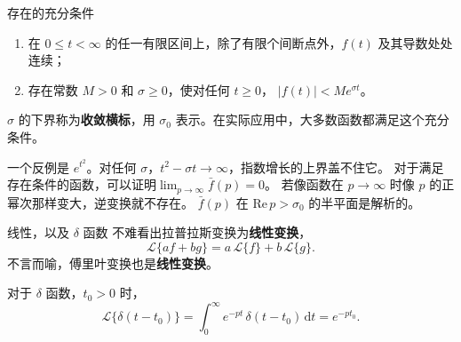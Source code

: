 \documentclass[fontset=windows, chinese, 10pt, xcolor=dvipsnames]{beamer}
\begin{document}
\begin{frame}{存在的充分条件}
  \begin{enumerate}
    \item 在 $0\leq t<\infty$ 的任一有限区间上，除了有限个间断点外，$f(t)$ 及其导数处处连续；
    \item 存在常数 $M>0$ 和 $\sigma\geq 0$，使对任何 $t\geq 0$，
      $|f(t)|<M e^{\sigma t}$。
  \end{enumerate}
  $\sigma$ 的下界称为\textbf{收敛横标}，用 $\sigma_0$ 表示。在实际应用中，大多数函数都满足这个充分条件。
  \vspace{0.3em}

  一个反例是 $e^{t^2}$。对任何 $\sigma$，$t^2-\sigma t\to\infty$，指数增长的上界盖不住它。
  对于满足存在条件的函数，可以证明$\lim_{p\to\infty}\bar f(p)=0$。
  若像函数在 $p\to\infty$ 时像 $p$ 的正幂次那样变大，逆变换就不存在。
  $\bar f(p)$ 在 $\mathrm{Re}\,p>\sigma_0$ 的半平面是解析的。
\end{frame}



\begin{frame}{线性，以及 $\delta$ 函数}
  不难看出拉普拉斯变换为\textbf{线性变换}，
  \begin{equation*}
    \mathcal{L}\{af+bg\}
    =a\,\mathcal{L}\{f\}+b\,\mathcal{L}\{g\}.
  \end{equation*}
  不言而喻，傅里叶变换也是\textbf{线性变换}。
  \vspace{0.4em}

  对于 $\delta$ 函数，$t_0>0$ 时，
  \begin{equation*}
    \mathcal{L}\{\delta(t-t_0)\}
    =\int_0^{\infty} e^{-pt}\,\delta(t-t_0)\,\mathrm{d}t
    =e^{-pt_0}.
  \end{equation*}
\end{frame}
\end{document}
